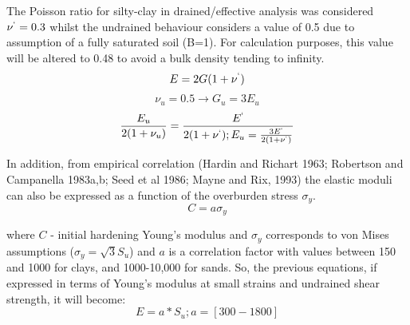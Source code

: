 \documentclass[10pt,a4paper]{report}
\begin{document}
The Poisson ratio for silty-clay in drained/effective analysis was considered $\nu^`=0.3$ whilst the undrained behaviour considers a value of 0.5 due to assumption of a fully saturated soil (B=1). For calculation purposes, this value will be altered to 0.48 to avoid a bulk density tending to infinity. 
\begin{equation}
	E=2G(1+\nu^`)
\end{equation}
\begin{equation}
	\nu_u=0.5\longrightarrow G_u=3E_u
\end{equation}
\begin{equation}
	\frac{E_u}{2(1+\nu_u)}=\frac{E^`}{2(1+\nu^`); E_u=\frac{3E^`}{2(1+\nu^`)}}
\end{equation}

In addition, from empirical correlation (Hardin and Richart 1963; Robertson and Campanella 1983a,b; Seed et al 1986; Mayne and Rix, 1993) the elastic moduli can also be expressed as a function of the overburden stress $\sigma_y$.
\begin{equation}
	C=a\sigma_y
\end{equation} 

where $C$ - initial hardening Young's modulus and $\sigma_y$ corresponds to von Mises assumptions ($\sigma_y=\sqrt3 S_u$) and $a$ is a correlation factor with values between 150 and 1000 for clays, and 1000-10,000 for sands. So, the previous equations, if expressed in terms of Young's modulus at small strains and undrained shear strength, it will become:
\begin{equation}
	E=a*S_u;   a=[300-1800]
\end{equation}
\end{document}
